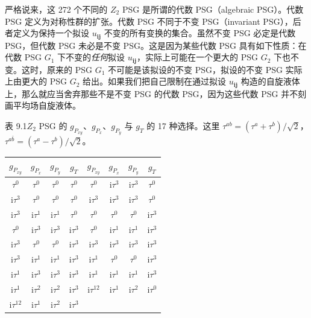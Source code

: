 严格说来，这 272 个不同的 $Z_2$ PSG 是所谓的代数 PSG（algebraic PSG）。代数 PSG 定义为对称性群的扩张。代数 PSG 不同于不变 PSG（invariant PSG），后者定义为保持一个拟设 $u_{\pmb{ij}}$ 不变的所有变换的集合。虽然不变 PSG 必定是代数 PSG，但代数 PSG 未必是不变 PSG。这是因为某些代数 PSG 具有如下性质：在代数 PSG $G_1$ 下不变的\emph{任何}拟设 $u_{\pmb{ij}}$，实际上可能在一个更大的 PSG $G_2$ 下也不变。这时，原来的 PSG $G_1$ 不可能是该拟设的不变 PSG，拟设的不变 PSG 实际上由更大的 PSG $G_2$ 给出。如果我们把自己限制在通过拟设 $u_{\pmb{ij}}$ 构造的自旋液体上，那么就应当舍弃那些不是不变 PSG 的代数 PSG，因为这些代数 PSG 并不刻画平均场自旋液体。

\begin{center}
\small 表 9.1\quad $Z_2$ PSG 的 $g_{P_{xy}}$、$g_{P_x}$、$g_{P_y}$ 与 $g_T$ 的 17 种选择。这里 $\tau^{ab}=(\tau^{a}+\tau^{b})/\sqrt{2}$，$\tau^{a\bar{b}}=(\tau^{a}-\tau^{b})/\sqrt{2}$。\\[6pt]
\begin{tabular}{cccccccc}
\toprule
$g_{P_{xy}}$ & $g_{P_x}$ & $g_{P_y}$ & $g_T$ & $g_{P_{xy}}$ & $g_{P_x}$ & $g_{P_y}$ & $g_T$ \\
\midrule
$\tau^0$ & $\tau^0$ & $\tau^0$ & $\tau^0$ & $\tau^0$ & $\mathrm{i}\tau^3$ & $\mathrm{i}\tau^3$ & $\tau^0$ \\
$\mathrm{i}\tau^3$ & $\tau^0$ & $\tau^0$ & $\tau^0$ & $\mathrm{i}\tau^3$ & $\mathrm{i}\tau^3$ & $\mathrm{i}\tau^3$ & $\tau^0$ \\
$\mathrm{i}\tau^3$ & $\mathrm{i}\tau^1$ & $\mathrm{i}\tau^1$ & $\tau^0$ & $\tau^0$ & $\tau^0$ & $\tau^0$ & $\mathrm{i}\tau^3$ \\
$\tau^0$ & $\mathrm{i}\tau^3$ & $\mathrm{i}\tau^3$ & $\mathrm{i}\tau^3$ & $\tau^0$ & $\mathrm{i}\tau^1$ & $\mathrm{i}\tau^1$ & $\mathrm{i}\tau^3$ \\
$\mathrm{i}\tau^3$ & $\tau^0$ & $\tau^0$ & $\mathrm{i}\tau^3$ & $\mathrm{i}\tau^3$ & $\mathrm{i}\tau^3$ & $\mathrm{i}\tau^3$ & $\mathrm{i}\tau^3$ \\
$\mathrm{i}\tau^3$ & $\mathrm{i}\tau^1$ & $\mathrm{i}\tau^1$ & $\mathrm{i}\tau^3$ & $\mathrm{i}\tau^1$ & $\tau^0$ & $\tau^0$ & $\mathrm{i}\tau^3$ \\
$\mathrm{i}\tau^1$ & $\mathrm{i}\tau^3$ & $\mathrm{i}\tau^3$ & $\mathrm{i}\tau^3$ & $\mathrm{i}\tau^1$ & $\mathrm{i}\tau^1$ & $\mathrm{i}\tau^1$ & $\mathrm{i}\tau^3$ \\
$\mathrm{i}\tau^1$ & $\mathrm{i}\tau^2$ & $\mathrm{i}\tau^2$ & $\mathrm{i}\tau^3$ & $\mathrm{i}\tau^{12}$ & $\mathrm{i}\tau^1$ & $\mathrm{i}\tau^2$ & $\mathrm{i}\tau^0$ \\
$\mathrm{i}\tau^{12}$ & $\mathrm{i}\tau^1$ & $\mathrm{i}\tau^2$ & $\mathrm{i}\tau^3$ & & & & \\
\bottomrule
\end{tabular}
\end{center}

